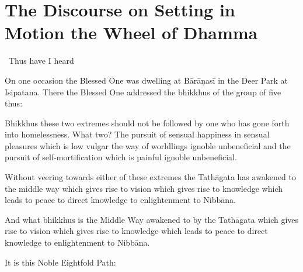 \section{The Discourse on Setting in Motion the Wheel of Dhamma}
\label{wheel-of-dhamma-full}

\begin{leader-english}
  \anglebracketleft\ \hspace{-0.5mm}Thus have I heard \hspace{-0.5mm}\anglebracketright\
\end{leader-english}

\smallskip

\begin{english-only-hang}
  On one occasion the Blessed One was dwelling at Bārāṇasī in the Deer Park at Isipatana. There the Blessed One addressed the bhikkhus of the group of five thus:
\end{english-only-hang}

\medskip

\begin{english-only-hang}
  Bhikkhus these two extremes should not be followed by one who has gone forth into homelessness. What two? The pursuit of sensual happiness in sensual pleasures which is low vulgar the way of worldlings ignoble unbeneficial and the pursuit of self-mortification which is painful ignoble unbeneficial.
\end{english-only-hang}

\medskip

\begin{english-only-hang}
  Without veering towards either of these extremes the Tathāgata has awakened to the middle way which gives rise to vision which gives rise to knowledge which leads to peace to direct knowledge to enlightenment to Nibbāna.
\end{english-only-hang}

\medskip

\begin{english-only-hang}
  And what bhikkhus is the Middle Way awakened to by the Tathāgata which gives rise to vision which gives rise to knowledge which leads to peace to direct knowledge to enlightenment to Nibbāna.
\end{english-only-hang}

\medskip

\begin{english-only-hang}
  It is this Noble Eightfold Path:
\end{english-only-hang}


